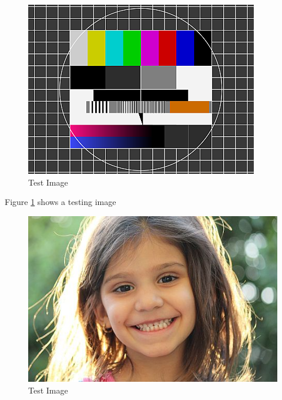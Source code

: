 \documentclass{article}
\begin{document}
\begin{figure}
\includegraphics{"images/test"}
\caption{Test Image}
\label{fig:test}
\end{figure}
Figure \ref{fig:test} shows a testing image


\begin{figure}[p!]
\includegraphics{"images/cute-girl"}
\caption{Test Image}
\label{fig:cute-girl}
\end{figure}
\end{document}
